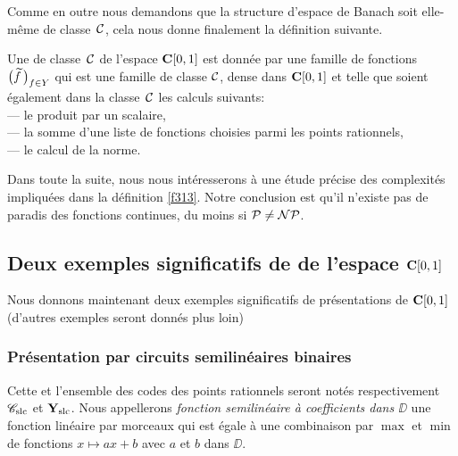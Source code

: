 Comme en outre nous demandons que la structure d'espace de Banach soit elle-même de classe~${{\cal C}}$, cela nous donne finalement la définition suivante.

\begin{fdefinition} \label{f313}
Une \rp  de classe~${{\cal C}}$   de l'espace  ${{\bf C}[0,1]}$  est donnée par une famille de 
fonctions  $\big(\widetilde{f}\,\big)_{f \in Y}$  qui est une famille \uni de classe  
${{\cal C}}$, dense dans ${{\bf C}[0,1]}$  et telle que soient également dans la classe~${{\cal C}}$   
les calculs suivants:\\
--- le produit par un scalaire,\\  
--- la somme d'une liste de fonctions choisies parmi les points rationnels,\\
--- le calcul de la norme.
\end{fdefinition}

Dans toute la suite, nous nous intéresserons à une étude précise des 
complexités impliquées dans la définition \ref{f313}. Notre conclusion 
est qu'il n'existe pas de paradis \etpo des fonctions continues, du moins si  
${\cal P} \not= {\cal NP}$.  


\subsection{Deux exemples significatifs de \rps  de l'espace 
\texorpdfstring{${{\bf C}[0,1]}$}{C[0,1]}}\label{fsubsec32}

Nous donnons maintenant deux exemples significatifs de présentations de  
${{\bf C}[0,1]}$ (d'autres exemples seront donnés plus loin)   

\subsubsection{Présentation par circuits semilinéaires binaires} 
\label{fsubsubsec321}  
Cette \pres et l'ensemble des codes des points rationnels seront notés 
respectivement  ${{{\mathscr C}}_{\rm slc}}$  et  ${{\bf Y}_{\rm slc}}$.  Nous appellerons {\em  fonction 
semilinéaire à coefficients dans  $\DD$ }  une fonction linéaire par 
morceaux qui est égale à une combinaison par  $\max$  et  $\min$  de 
fonctions  $x \mapsto ax+b$  avec  $a$  et  $b$  dans  $\DD$.


